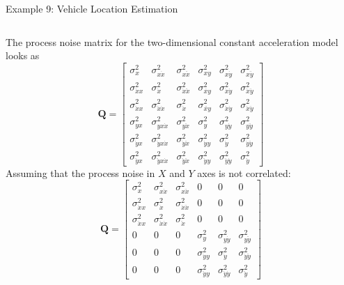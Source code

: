 \begin{frame}{Example 9: Vehicle Location Estimation}
\begin{columns}
The process noise matrix for the two-dimensional constant acceleration model looks as
\[
\mathbf{Q} =
\begin{bmatrix}
\sigma^2_x & \sigma^2_{x\dot{x}} & \sigma^2_{x\ddot{x}} & \sigma^2_{xy} & \sigma^2_{x\dot{y}} & \sigma^2_{x\ddot{y}} \\
\sigma^2_{\dot{x}x} & \sigma^2_{\dot{x}} & \sigma^2_{\dot{x}\ddot{x}} & \sigma^2_{\dot{xy}} & \sigma^2_{\dot{x}\dot{y}} & \sigma^2_{\dot{x}\ddot{y}} \\
\sigma^2_{\ddot{x}x} & \sigma^2_{\ddot{x}\dot{x}} & \sigma^2_{\ddot{x}} & \sigma^2_{\ddot{xy}} & \sigma^2_{\ddot{x}\dot{y}} & \sigma^2_{\ddot{x}\ddot{y}} \\
\sigma^2_{yx} & \sigma^2_{yx\dot{x}} & \sigma^2_{y\ddot{x}} & \sigma^2_{y} & \sigma^2_{y\dot{y}} & \sigma^2_{y\ddot{y}} \\
\sigma^2_{\dot{y}x} & \sigma^2_{\dot{y}x\dot{x}} & \sigma^2_{\dot{y}\ddot{x}} & \sigma^2_{\dot{y}y} & \sigma^2_{\dot{y}} & \sigma^2_{\dot{y}\ddot{y}} \\
\sigma^2_{\ddot{y}x} & \sigma^2_{\ddot{y}x\dot{x}} & \sigma^2_{\ddot{y}\ddot{x}} & \sigma^2_{\ddot{y}y} & \sigma^2_{\ddot{y}\dot{y}} & \sigma^2_{\ddot{y}}
\end{bmatrix}
\]
Assuming that the process noise in $X$ and $Y$ axes is not correlated:
\[
\mathbf{Q} =
\begin{bmatrix}
\sigma^2_x & \sigma^2_{x\dot{x}} & \sigma^2_{x\ddot{x}} & 0 & 0 & 0 \\
\sigma^2_{\dot{x}x} & \sigma^2_{\dot{x}} & \sigma^2_{\dot{x}\ddot{x}} & 0 & 0 & 0 \\
\sigma^2_{\ddot{x}x} & \sigma^2_{\ddot{x}\dot{x}} & \sigma^2_{\ddot{x}} & 0 & 0 & 0 \\
0 & 0 & 0 & \sigma^2_{y} & \sigma^2_{y\dot{y}} & \sigma^2_{y\ddot{y}} \\
0 & 0 & 0 & \sigma^2_{\dot{y}y} & \sigma^2_{\dot{y}} & \sigma^2_{\dot{y}\ddot{y}} \\
0 & 0 & 0 & \sigma^2_{\ddot{y}y} & \sigma^2_{\ddot{y}\dot{y}} & \sigma^2_{\ddot{y}}
\end{bmatrix}
\]
\end{columns}
\end{frame}

